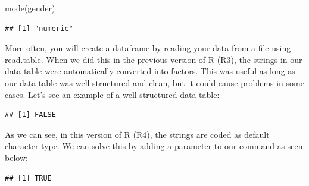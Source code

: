 \documentclass[
]{book}
\newenvironment{Shaded}{\begin{snugshade}}{\end{snugshade}}
\newcommand{\AttributeTok}[1]{\textcolor[rgb]{0.77,0.63,0.00}{#1}}
\newcommand{\ConstantTok}[1]{\textcolor[rgb]{0.00,0.00,0.00}{#1}}
\newcommand{\FunctionTok}[1]{\textcolor[rgb]{0.00,0.00,0.00}{#1}}
\newcommand{\NormalTok}[1]{#1}
\newcommand{\OtherTok}[1]{\textcolor[rgb]{0.56,0.35,0.01}{#1}}
\newcommand{\SpecialCharTok}[1]{\textcolor[rgb]{0.00,0.00,0.00}{#1}}
\newcommand{\StringTok}[1]{\textcolor[rgb]{0.31,0.60,0.02}{#1}}
\theoremstyle{definition}
\theoremstyle{definition}
\theoremstyle{definition}
\theoremstyle{definition}
\theoremstyle{remark}
\begin{document}
\begin{Shaded}
\begin{Highlighting}[]
\FunctionTok{mode}\NormalTok{(gender)}
\end{Highlighting}
\end{Shaded}

\begin{verbatim}
## [1] "numeric"
\end{verbatim}

More often, you will create a dataframe by reading your data from a file using read.table. When we did this in the previous version of R (R3), the strings in our data table were automatically converted into factors. This was useful as long as our data table was well structured and clean, but it could cause problems in some cases. Let's see an example of a well-structured data table:

\begin{Shaded}
\end{Shaded}

\begin{verbatim}
## [1] FALSE
\end{verbatim}

As we can see, in this version of R (R4), the strings are coded as default character type. We can solve this by adding a parameter to our command as seen below:

\begin{Shaded}
\end{Shaded}

\begin{verbatim}
## [1] TRUE
\end{verbatim}
\end{document}
